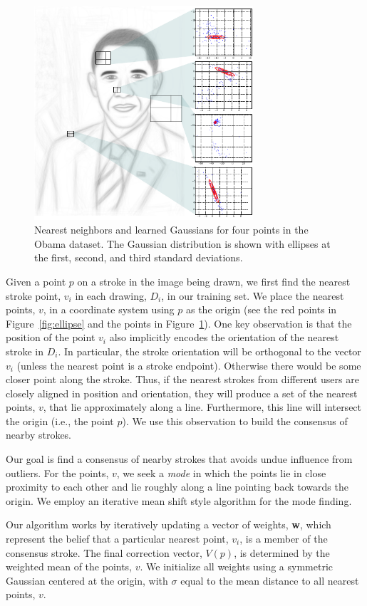 \begin{figure}
  \centering%
  \includegraphics[width=3.2in]{figures/nearest-neighbor-plots.pdf}
  \caption{Nearest neighbors and learned Gaussians for four points in the Obama dataset.  The Gaussian distribution is shown with ellipses at the first, second, and third standard deviations.}
  \label{fig:neighbors}
\end{figure}


Given a point $p$ on a stroke in the image being drawn, we first find the nearest stroke point, $v_i$ in each drawing, $D_i$, in our training set. We place the nearest points, $v$, in a coordinate system using $p$ as the origin (see the red points in Figure~\ref{fig:ellipse} and the points in Figure~\ref{fig:neighbors}). One key observation is that the position of the point $v_i$ also implicitly encodes the orientation of the nearest stroke in $D_i$. In particular, the stroke orientation will be orthogonal to the vector $v_i$ (unless the nearest point is a stroke endpoint). Otherwise there would be some closer point along the stroke. Thus, if the nearest strokes from different users are closely aligned in position and orientation, they will produce a set of the nearest points, $v$, that lie approximately along a line. Furthermore, this line will intersect the origin (i.e., the point $p$). We use this observation to build the consensus of nearby strokes.

Our goal is find a consensus of nearby strokes that avoids undue influence from outliers. For the points, $v$, we seek a {\em mode} in which the points lie in close proximity to each other and lie roughly along a line pointing back towards the origin. We employ an iterative mean shift style algorithm for the mode finding.

Our algorithm works by iteratively updating a vector of weights, {\bf w}, which represent the belief that a particular nearest point, $v_i$, is a member of the consensus stroke. The final correction vector, $V(p)$, is determined by the weighted mean of the points, $v$. We initialize all weights using a symmetric Gaussian centered at the origin, with $\sigma$ equal to the mean distance to all nearest points, $v$.


